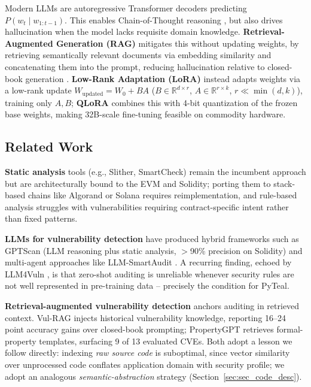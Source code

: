 \documentclass[lettersize,journal]{IEEEtran}
\begin{document}
Modern LLMs are autoregressive Transformer decoders \cite{vaswani2017attention} predicting $P(w_t
\mid w_{1:t-1})$. This enables Chain-of-Thought reasoning \cite{wei2022chain}, but also drives
hallucination when the model lacks requisite domain knowledge. \textbf{Retrieval-Augmented
Generation (RAG)} \cite{lewis2020rag} mitigates this without updating weights, by retrieving
semantically relevant documents via embedding similarity and concatenating them into the prompt,
reducing hallucination relative to closed-book generation \cite{shuster2021retrieval}.
\textbf{Low-Rank Adaptation (LoRA)} \cite{hu2021lora} instead adapts weights via a low-rank update
$W_{\text{updated}} = W_0 + BA$ ($B \in \mathbb{R}^{d\times r}$, $A \in \mathbb{R}^{r\times k}$, $r
\ll \min(d,k)$), training only $A,B$; \textbf{QLoRA} \cite{dettmers2023qlora} combines this with
4-bit quantization of the frozen base weights, making 32B-scale fine-tuning feasible on commodity
hardware.

\subsection{Related Work}
\label{sec:related}

\textbf{Static analysis} tools (e.g., Slither, SmartCheck) remain the incumbent approach but are
architecturally bound to the EVM and Solidity; porting them to stack-based chains like Algorand or
Solana requires reimplementation, and rule-based analysis struggles with vulnerabilities requiring
contract-specific intent rather than fixed patterns.

\textbf{LLMs for vulnerability detection} have produced hybrid frameworks such as GPTScan
\cite{sun2024gptscan} (LLM reasoning plus static analysis, $>$90\% precision on Solidity) and
multi-agent approaches like LLM-SmartAudit \cite{llmsmartaudit2024}. A recurring finding, echoed by
LLM4Vuln \cite{llm4vuln2024}, is that zero-shot auditing is unreliable whenever security rules are
not well represented in pre-training data -- precisely the condition for PyTeal.

\textbf{Retrieval-augmented vulnerability detection} anchors auditing in retrieved context. Vul-RAG
\cite{vulrag2024} injects historical vulnerability knowledge, reporting 16--24 point accuracy gains
over closed-book prompting; PropertyGPT \cite{propertygpt2025} retrieves formal-property templates,
surfacing 9 of 13 evaluated CVEs. Both adopt a lesson we follow directly: indexing \emph{raw source
code} is suboptimal, since vector similarity over unprocessed code conflates application domain with
security profile; we adopt an analogous \emph{semantic-abstraction} strategy
(Section~\ref{sec:sec_code_desc}).
\end{document}
